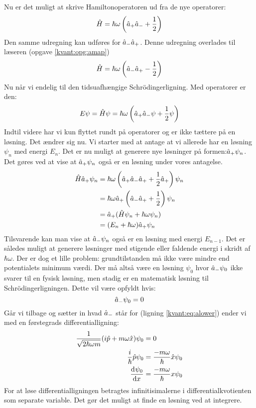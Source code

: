 \documentclass[../Kvantemekanik.tex]{subfiles}
\begin{document}
Nu er det muligt at skrive Hamiltonoperatoren ud fra de nye operatorer:
$$
\op H = \hbar \omega\left(\op a_+\op a_-+\frac{1}{2}\right)
$$
Den samme udregning kan udføres for $\op a_- \op a_+$. Denne udregning overlades til læseren (opgave \ref{kvant:opg:amap})
\begin{equation}
\op H = \hbar \omega\left(\op a_-\op a_+ -\frac{1}{2}\right)
\label{kvant:eq:Hamap}
\end{equation}
Nu når vi endelig til den tidsuafhængige Schrödingerligning. Med operatorer er den:
$$
E\psi = \op H \psi = \hbar\omega \left(\op a_+\op a_-\psi+\frac{1}{2}\psi\right)
$$
Indtil videre har vi kun flyttet rundt på operatorer og er ikke tættere på en løsning. Det ændrer sig nu. Vi starter med at antage at vi allerede har en løsning $\psi_n$ med energi $E_n$. Det er nu muligt at generere nye løsninger på formen:$\op a_+\psi_n$. Det gøres ved at vise at $\op a_+\psi_n$ også er en løsning under vores antagelse.
\begin{align*}
\op H \op a_+ \psi_n &= \hbar\omega\left(\op a_+\op a_-\op a_++\frac{1}{2}\op a_+\right)\psi_n\\
&= \hbar\omega\op a_+\left(\op a_-\op a_+ +\frac{1}{2}\right)\psi_n\\
&=\op a_+(\op H\psi_n + \hbar\omega\psi_n)\\
&= (E_n+\hbar\omega)\op a_+ \psi_n
\end{align*}
Tilsvarende kan man vise at $\op a_-\psi_n$ også er en løsning med energi $E_{n-1}$. Det er således muligt at generere løsninger med stigende eller faldende energi  i skridt af $\hbar \omega$. Der er dog et lille problem: grundtilstanden må ikke være mindre end potentialets minimum værdi. Der må altså være en løsning $\psi_0$ hvor $\op a_-\psi_0$ ikke svarer til en fysisk løsning, men stadig er en matematisk løsning til Schrödingerligningen. Dette vil være opfyldt hvis:
$$
\op a_-\psi_0  = 0
$$
Går vi tilbage og sætter in hvad $\op a_-$ står for (ligning \eqref{kvant:eq:alower}) ender vi med en førstegrads differentialligning:
\begin{align*}
\frac{1}{\sqrt{2\hbar\omega m}}(i\op p+m\omega \op x)\psi_0&=0\\
\frac{i}{\hbar}\op p\psi_0 &= \frac{-m\omega}{\hbar}\op x\psi_0\\
\dif{x}{\psi_0}&=\frac{-m\omega}{\hbar}x\psi_0
\end{align*}
For at løse differentialligningen betragtes infinitisimalerne i differentialkvotienten som separate variable. Det gør det muligt at finde en løsning ved at integrere.
\end{document}
